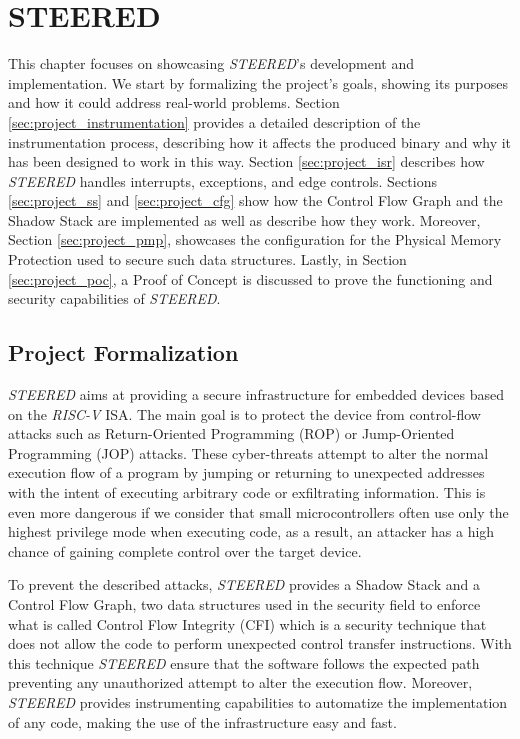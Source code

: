 \chapter{STEERED}
\label{cha:project}

This chapter focuses on showcasing \textit{STEERED}'s development and implementation.
We start by formalizing the project's goals, showing its purposes and how it could
address real-world problems. Section \ref{sec:project_instrumentation} provides
a detailed description of the instrumentation process, describing how it affects
the produced binary and why it has been designed to work in this way. Section
\ref{sec:project_isr} describes how \textit{STEERED} handles interrupts,
exceptions, and edge controls. Sections \ref{sec:project_ss} and
\ref{sec:project_cfg} show how the Control Flow Graph and the Shadow Stack are
implemented as well as describe how they work. Moreover, Section
\ref{sec:project_pmp}, showcases the configuration for the Physical Memory Protection
used to secure such data structures. Lastly, in Section \ref{sec:project_poc}, a
Proof of Concept is discussed to prove the functioning and security capabilities
of \textit{STEERED}.

\section{Project Formalization}
\label{sec:project_formalization}

\textit{STEERED} aims at providing a secure infrastructure for embedded devices based
on the \textit{RISC-V} ISA. The main goal is to protect the device from control-flow
attacks such as Return-Oriented Programming (ROP) or Jump-Oriented Programming (JOP)
attacks. These cyber-threats attempt to alter the normal execution flow of a
program by jumping or returning to unexpected addresses with the intent of
executing arbitrary code or exfiltrating information. This is even more dangerous
if we consider that small microcontrollers often use only the highest privilege mode
when executing code, as a result, an attacker has a high chance of gaining complete
control over the target device.

To prevent the described attacks, \textit{STEERED} provides a Shadow Stack and a
Control Flow Graph, two data structures used in the security field to enforce
what is called Control Flow Integrity (CFI) which is a security technique that
does not allow the code to perform unexpected control transfer instructions. With
this technique \textit{STEERED} ensure that the software follows the expected
path preventing any unauthorized attempt to alter the execution flow. Moreover,
\textit{STEERED} provides instrumenting capabilities to automatize the implementation
of any code, making the use of the infrastructure easy and fast.

